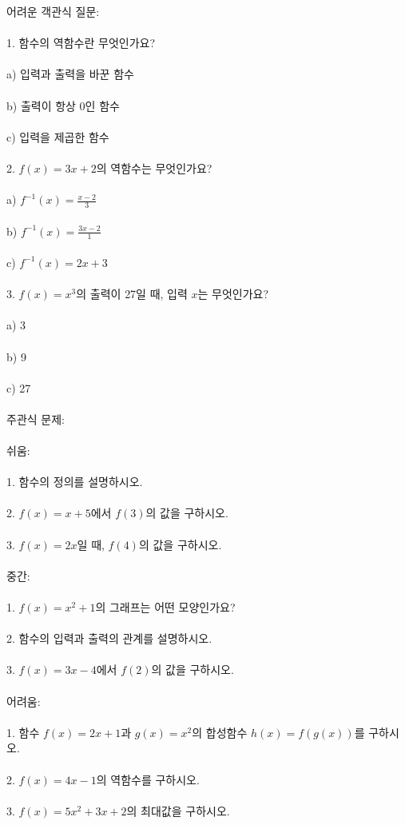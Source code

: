 \documentclass[fleqn]{article}
\begin{document}
어려운 객관식 질문: \\\\  
1. 함수의 역함수란 무엇인가요? \\\\
   a) 입력과 출력을 바꾼 함수 \\\\
   b) 출력이 항상 0인 함수 \\\\
   c) 입력을 제곱한 함수 \\\\

2. $f(x) = 3x + 2$의 역함수는 무엇인가요? \\\\
   a) $f^{-1}(x) = \frac{x-2}{3}$ \\\\
   b) $f^{-1}(x) = \frac{3x - 2}{1}$ \\\\
   c) $f^{-1}(x) = 2x + 3$ \\\\

3. $f(x) = x^3$의 출력이 27일 때, 입력 $x$는 무엇인가요? \\\\
   a) 3 \\\\
   b) 9 \\\\
   c) 27 \\\\

주관식 문제: \\\\  
쉬움: \\\\
1. 함수의 정의를 설명하시오. \\\\
2. $f(x) = x + 5$에서 $f(3)$의 값을 구하시오. \\\\
3. $f(x) = 2x$일 때, $f(4)$의 값을 구하시오. \\\\

중간: \\\\
1. $f(x) = x^2 + 1$의 그래프는 어떤 모양인가요? \\\\
2. 함수의 입력과 출력의 관계를 설명하시오. \\\\
3. $f(x) = 3x - 4$에서 $f(2)$의 값을 구하시오. \\\\

어려움: \\\\
1. 함수 $f(x) = 2x + 1$과 $g(x) = x^2$의 합성함수 $h(x) = f(g(x))$를 구하시오. \\\\
2. $f(x) = 4x - 1$의 역함수를 구하시오. \\\\
3. $f(x) = 5x^2 + 3x + 2$의 최대값을 구하시오. \\\\

      
      
\end{document}

